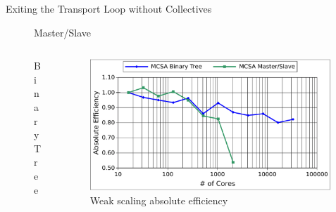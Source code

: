 \documentclass{beamer}
\begin{document}
\begin{frame}{Exiting the Transport Loop without Collectives}

  \vspace{-0.25in}

  \begin{figure}[htpb!]
    \begin{center}
      \scalebox{0.4}{  }
    \end{center}
    \caption{Master/Slave}
  \end{figure}

  \begin{columns}

    \begin{column}{0.5\textwidth}
      \vspace{-0.75in}
      \begin{figure}[htpb!]
        \begin{center}
          \scalebox{0.4}{  }
        \end{center}
        \caption{Binary Tree}
      \end{figure}

    \end{column}

    \begin{column}{0.5\textwidth}

      \vspace{-0.5in}
      
      \begin{figure}[t!]
        \begin{center}
          \includegraphics[width=0.99\textwidth]{titan_weak_bvsm.pdf}
        \end{center}
        \caption{Weak scaling absolute efficiency}
        \label{fig:titan_weak_bvsm}
      \end{figure}

    \end{column}

  \end{columns}

\end{frame}
\end{document}
